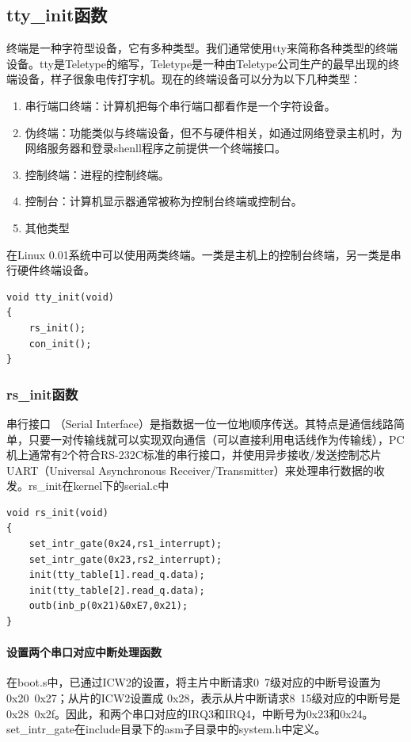 \documentclass[12pt]{article}
\begin{document}
\subsection{tty\_init函数}
终端是一种字符型设备，它有多种类型。我们通常使用tty来简称各种类型的终端设备。tty是Teletype的缩写，Teletype是一种由Teletype公司生产的最早出现的终端设备，样子很象电传打字机。现在的终端设备可以分为以下几种类型：
\begin{enumerate}
\item 串行端口终端：计算机把每个串行端口都看作是一个字符设备。
\item 伪终端：功能类似与终端设备，但不与硬件相关，如通过网络登录主机时，为网络服务器和登录shenll程序之前提供一个终端接口。
\item 控制终端：进程的控制终端。
\item 控制台：计算机显示器通常被称为控制台终端或控制台。
\item 其他类型
\end{enumerate}
在Linux 0.01系统中可以使用两类终端。一类是主机上的控制台终端，另一类是串行硬件终端设备。
\begin{lstlisting}[breaklines]
void tty_init(void)
{
	rs_init();
	con_init();
}
\end{lstlisting}
\subsubsection{rs\_init函数}
串行接口 （Serial Interface）是指数据一位一位地顺序传送。其特点是通信线路简单，只要一对传输线就可以实现双向通信（可以直接利用电话线作为传输线），PC机上通常有2个符合RS-232C标准的串行接口，并使用异步接收/发送控制芯片UART（Universal Asynchronous Receiver/Transmitter）来处理串行数据的收发。rs\_init在kernel下的serial.c中
\begin{lstlisting}[breaklines]
void rs_init(void)
{
	set_intr_gate(0x24,rs1_interrupt);
	set_intr_gate(0x23,rs2_interrupt);
	init(tty_table[1].read_q.data);
	init(tty_table[2].read_q.data);
	outb(inb_p(0x21)&0xE7,0x21);
}
\end{lstlisting}
\paragraph{设置两个串口对应中断处理函数}
在boot.s中，已通过ICW2的设置，将主片中断请求0~7级对应的中断号设置为0x20~0x27；从片的ICW2设置成 0x28，表示从片中断请求8~15级对应的中断号是 0x28~0x2f。因此，和两个串口对应的IRQ3和IRQ4，中断号为0x23和0x24。set\_intr\_gate在include目录下的asm子目录中的system.h中定义。
\end{document}
